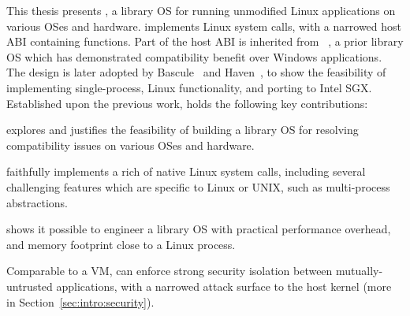 

This thesis presents {\bf \graphene{}}, a library OS for running unmodified Linux applications on various OSes and hardware.
\graphene{} implements %
Linux system calls,
with a narrowed host ABI containing \palcallnum{} functions.
Part of the host ABI is inherited from \drawbridge{}~\cite{porter11drawbridge}, a prior library OS which has demonstrated compatibility benefit over
Windows applications.
The \drawbridge{} design is later adopted by Bascule~\cite{baumann13bascule} and Haven~\cite{baumann14haven}, to show the feasibility of implementing single-process, Linux functionality, and porting to Intel SGX.
Established upon the previous work, \graphene{} holds the following key contributions:
\begin{compactenum}
\item \graphene{} explores and justifies the feasibility of building a library OS for resolving compatibility issues on various OSes and hardware.
\item \graphene{} faithfully implements a rich of native Linux system calls, including several challenging features which are specific to Linux or UNIX,
such as multi-process abstractions.
\item \graphene{} shows it possible to engineer a library OS
with practical performance overhead,
and memory footprint close to a Linux process.
\item Comparable to a VM, \graphene{} can enforce strong security isolation
between mutually-untrusted applications,
with a narrowed attack surface to the host kernel (more in Section~\ref{sec:intro:security}).
\end{compactenum}


